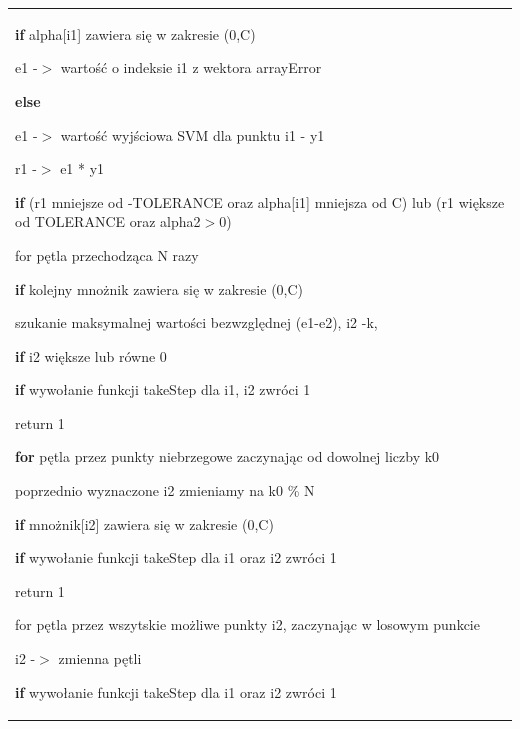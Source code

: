 \documentclass[11pt]{article}
\begin{document}
\begin{enumerate}
\begin{tabular}{|p{11.5cm}|}
\noindent 

\noindent \textbf{if} alpha[i1] zawiera się w zakresie (0,C)

 \hspace{1em}e1 -$>$ wartość o indeksie i1 z wektora arrayError

\noindent \textbf{else}

 \hspace{1em}e1 -$>$ wartość wyjściowa SVM dla punktu i1 - y1

\noindent r1 -$>$ e1 * y1

\noindent \textbf{if} (r1 mniejsze od -TOLERANCE oraz alpha[i1] mniejsza od C) lub (r1 większe od TOLERANCE oraz alpha2$>$0)

 \hspace{1em}for pętla przechodząca N razy

  \hspace{2em}\textbf{if} kolejny mnożnik zawiera się w zakresie (0,C)

   \hspace{3em}szukanie maksymalnej wartości bezwzględnej (e1-e2), i2 -k,

  \hspace{2em}\textbf{if} i2 większe lub równe 0

   \hspace{3em}\textbf{if} wywołanie funkcji takeStep dla i1, i2 zwróci 1

    \hspace{4em}return 1

 \hspace{1em}\textbf{for} pętla przez punkty niebrzegowe zaczynając od dowolnej liczby k0

  \hspace{2em}poprzednio wyznaczone i2 zmieniamy na k0 \% N

  \hspace{2em}\textbf{if} mnożnik[i2] zawiera się w zakresie (0,C)

   \hspace{3em}\textbf{if} wywołanie funkcji takeStep dla i1 oraz i2 zwróci 1

    \hspace{4em}return 1

 \hspace{1em}for pętla przez wszytskie możliwe punkty i2, zaczynając w losowym punkcie

  \hspace{2em}i2 -$>$ zmienna p\k{e}tli

   \hspace{3em}\textbf{if} wywołanie funkcji takeStep dla i1 oraz i2 zwróci 1


\end{tabular}
\end{enumerate}
\end{document}

